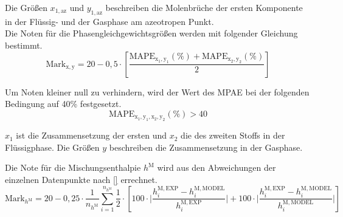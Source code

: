 \documentclass[../thesis.tex]{subfiles}
\begin{document}
Die Größen $ x_{1,\mathrm{az}} $ und $ y_{1,\mathrm{az}} $ beschreiben die Molenbrüche der ersten Komponente in der Flüssig- und der Gasphase am azeotropen Punkt.
\\

Die Noten für die Phasengleichgewichtsgrößen werden mit folgender Gleichung bestimmt.
\begin{equation}
	\mathrm{Mark}_{\mathrm{x,y}} = 20 - 0,5 \cdot \left[
		\dfrac{\mathrm{MAPE_{x_1,y_1}(\%)} + \mathrm{MAPE_{x_2,y_2}}(\%)}{2}
	\right]
\end{equation}

Um Noten kleiner null zu verhindern, wird der Wert des MPAE bei der folgenden Bedingung auf 40\% festgesetzt.
\begin{equation}
	\mathrm{MAPE_{x_1,y_1,x_2,y_2}}(\%) > 40
\end{equation}

$x_1$ ist die Zusammensetzung der ersten und $x_2$ die des zweiten Stoffs in der Flüssigphase. Die Größen $ y $ beschreiben die Zusammensetzung in der Gasphase.

Die Note für die Mischungsenthalpie $ h^{\mathrm{M}} $ wird aus den Abweichungen der einzelnen Datenpunkte nach \autoref{} errechnet.
\begin{equation}
\mathrm{Mark}_{h^{\mathrm{M}}} = 20 - 0,25 \cdot \dfrac{1}{n_{h^{\mathrm{M}}}} \sum_{i=1}^{n_{h^{\mathrm{M}}}}
	\dfrac{1}{2} \cdot \left[
		100 \cdot \biggl|
			\dfrac{h_i^{\mathrm{M,EXP}}-h_i^{\mathrm{M,MODEL}}}{h_i^{\mathrm{M,EXP}}} 
			\biggl| 
			+ 100 \cdot \biggl| \dfrac{h_i^{\mathrm{M,EXP}}-h_i^{\mathrm{M,MODEL}}}{h_i^{\mathrm{M,MODEL}}}
		\biggl|
	\right]
\end{equation}
\end{document}
